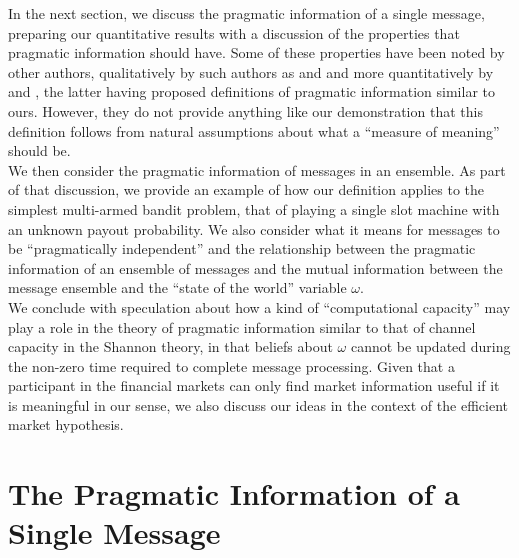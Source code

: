 \documentclass[11pt]{article}
\begin{document}
In the next section, we discuss the pragmatic information of a single message, preparing our quantitative results with a discussion of the properties that pragmatic information should have.
Some of these properties have been noted by other authors, qualitatively by such authors as \cite{Weizaeker} and \cite{Gernert}
and more quantitatively by \cite{Jumarie} and \cite {wow}, the latter having proposed definitions of pragmatic information similar to ours.  However, they do not provide anything like our demonstration that this definition follows from natural 
assumptions about what a ``measure of meaning'' should be.\\

We then consider the pragmatic information of messages in an ensemble.  As part of that discussion, we provide an example of how our definition applies to 
the simplest multi-armed bandit problem, that of playing a single slot machine with an unknown payout probability.  We also consider what it means for messages to be ``pragmatically independent'' and
the relationship between the pragmatic information of an ensemble of messages and the mutual information between the message ensemble and the ``state of the world'' variable $\omega$.  \\

We conclude with speculation about how a kind of ``computational capacity'' may play a role in the theory of pragmatic information similar to that of channel capacity in the Shannon theory, in that beliefs about $\omega$ cannot be updated during the non-zero time required to complete message processing.  Given that a participant in the financial markets can only find market information useful if it is meaningful in our sense, we also
discuss our ideas in the context of the efficient market hypothesis.

\section{The Pragmatic Information of a Single Message}
\end{document}
